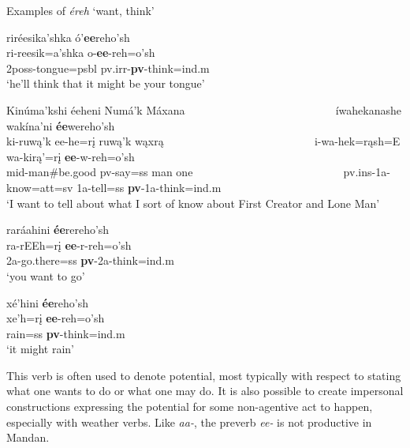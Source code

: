\begin{exe}

\item\label{ExThink} Examples of \textit{éreh} `want, think'

	\begin{xlist}
	
	\item \glll riréesika'shka ó'\textbf{ee}reho'sh\\
	ri-reesik=a'shka o-\textbf{ee}-reh=o'sh\\
	2poss-\textnormal{tongue}=psbl pv.irr-\textbf{pv}-\textnormal{think}=ind.m\\
	\glt `he'll think that it might be your tongue' \citep[189]{hollow1973a}
	
	\item \glll Kinúma'kshi éeheni Numá'k Máxana ~ ~ ~ ~ ~ ~ ~ ~ ~ ~ ~ ~ ~ ~ ~ ~ íwahekanashe wakína'ni \textbf{ée}wereho'sh\\
	ki-ruwą'k ee-he=rį ruwą'k wąxrą ~ ~ ~ ~ ~ ~ ~ ~ ~ ~ ~ ~ ~ ~ ~ ~ i-wa-hek=rąsh=E wa-kirą'=rį \textbf{ee}-w-reh=o'sh\\
	mid-\textnormal{man}\#\textnormal{be.good} pv-\textnormal{say}=ss \textnormal{man} \textnormal{one} ~ ~ ~ ~ ~ ~ ~ ~ ~ ~ ~ ~ ~ ~ ~ ~ pv.ins-1a-\textnormal{know}=att=sv 1a-\textnormal{tell}=ss \textbf{pv}-1a-\textnormal{think}=ind.m\\
	\glt `I want to tell about what I sort of know about First Creator and Lone Man' \citep[1]{hollow1973a}
	
	\item \glll raráahini \textbf{ée}rereho'sh\\
	ra-rEEh=rį \textbf{ee}-r-reh=o'sh\\
	2a-\textnormal{go.there}=ss \textbf{pv}-2a-\textnormal{think}=ind.m\\
	\glt `you want to go' \citep[31]{hollow1973a}
	
	\item \glll xé'hini \textbf{ée}reho'sh\\
	xe'h=rį \textbf{ee}-reh=o'sh\\
	\textnormal{rain}=ss \textbf{pv}-\textnormal{think}=ind.m\\
	\glt `it might rain' \citep[182]{hollow1970}
	
	\end{xlist}

\end{exe}

This verb is often used to denote potential, most typically with respect to stating what one wants to do or what one may do. It is also possible to create impersonal constructions expressing the potential for some non-agentive act to happen, especially with weather verbs. Like \textit{aa-}, the preverb \textit{ee-} is not productive in Mandan.

